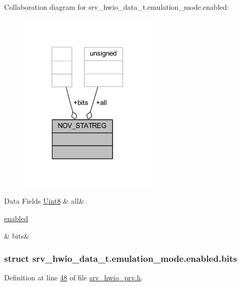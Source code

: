 Collaboration diagram for srv\+\_\+hwio\+\_\+data\+\_\+t.\+emulation\+\_\+mode.\+enabled\+:\nopagebreak
\begin{figure}[H]
\begin{center}
\leavevmode
\includegraphics[width=184pt]{d2/dca/a01683}
\end{center}
\end{figure}
\begin{DoxyFields}{Data Fields}
\hypertarget{a00034_aa181a603769c1f98ad927e7367c7aa51}{\hyperlink{a00072_af84840501dec18061d18a68c162a8fa2}{Uint8}}\label{a00034_aa181a603769c1f98ad927e7367c7aa51}
&
all&
\\
\hline

\hypertarget{a00034_acc411e6c13670e52124629b8ac83f7d0}{\hyperlink{a00034_d0/d7d/a00786}{enabled}}\label{a00034_acc411e6c13670e52124629b8ac83f7d0}
&
bits&
\\
\hline

\end{DoxyFields}
\label{d0/d7d/a00786}
\hypertarget{a00034_d0/d7d/a00786}{}
\subsubsection{struct srv\+\_\+hwio\+\_\+data\+\_\+t.\+emulation\+\_\+mode.\+enabled.\+bits}


Definition at line \hyperlink{a00034_source_l00048}{48} of file \hyperlink{a00034_source}{srv\+\_\+hwio\+\_\+prv.\+h}.



